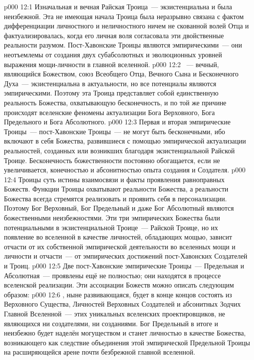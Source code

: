 \vs p000 12:1 Изначальная и вечная Райская Троица~--- экзистенциальна и была неизбежной. Эта не имеющая начала Троица была неразрывно связана с фактом дифференциации личностного и неличностного ничем не скованной волей Отца и фактуализировалась, когда его личная воля согласовала эти двойственные реальности разумом. Пост\hyp{}Хавонские Троицы являются эмпирическими~--- они неотъемлемы от создания двух субабсолютных и эволюционных уровней выражения мощи\hyp{}личности в главной вселенной.
\vs p000 12:2 \pc {}~--- вечный, являющийся Божеством, союз Всеобщего Отца, Вечного Сына и Бесконечного Духа~--- экзистенциальна в актуальности, но все потенциалы являются эмпирическими. Поэтому эта Троица представляет собой единственную реальность Божества, охватывающую бесконечность, и по той же причине происходят вселенские феномены актуализации Бога Верховного, Бога Предельного и Бога Абсолютного.
\vs p000 12:3 \pc Первая и вторая эмпирические Троицы~--- пост\hyp{}Хавонские Троицы~--- не могут быть бесконечными, ибо включают в себя  Божества, развившиеся с помощью эмпирической актуализации реальностей, созданных или возникших благодаря экзистенциальной Райской Троице. Бесконечность божественности постоянно обогащается, если не увеличивается, конечностью и абсонитностью опыта создания и Создателя.
\vs p000 12:4 Троицы суть истины взаимосвязи и факты проявления равноправных Божеств. Функции Троицы охватывают реальности Божества, а реальности Божества всегда стремятся реализовать и проявить себя в персонализации. Поэтому Бог Верховный, Бог Предельный и даже Бог Абсолютный являются божественными неизбежностями. Эти три эмпирических Божества были потенциальными в экзистенциальной Троице~--- Райской Троице, но их появление во вселенной в качестве личностей, обладающих мощью, зависит отчасти от их собственной эмпирической деятельности во вселенных мощи и личности и отчасти~--- от эмпирических достижений пост\hyp{}Хавонских Создателей и Троиц.
\vs p000 12:5 \pc Две пост\hyp{}Хавонские эмпирические Троицы~--- Предельная и Абсолютная~--- проявлены ещё не полностью; они находятся в процессе вселенской реализации. Эти ассоциации Божеств можно описать следующим образом:
\vs p000 12:6 , ныне развивающаяся, будет в конце концов состоять из Верховного Существа, Личностей Верховных Создателей и абсонитных Зодчих Главной Вселенной~--- этих уникальных вселенских проектировщиков, не являющихся ни создателями, ни созданиями. Бог Предельный в итоге и неизбежно будет наделён могуществом и станет личностью в качестве Божества, возникающего как следствие объединения этой эмпирической Предельной Троицы на расширяющейся арене почти безбрежной главной вселенной.
